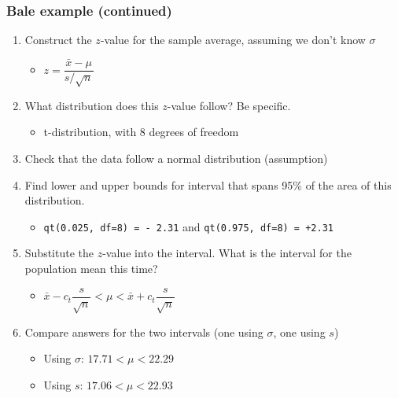 \begin{frame}\frametitle{Bale example (continued)}
	\begin{enumerate}
		\item Construct the $z$-value for the sample average, assuming we don't know $\sigma$ \pause
		\begin{itemize}
			\item $z = \dfrac{\bar{x} - \mu}{s/\sqrt{n}}$
		\end{itemize}
		\item What distribution does this $z$-value follow? Be specific. \pause
		\begin{itemize}
			\item t-distribution, with 8 degrees of freedom
		\end{itemize}
		\item Check that the data follow a normal distribution (assumption)
		\item Find lower and upper bounds for interval that spans 95\% of the area of this distribution. \pause
		\begin{itemize}
			\item \texttt{qt(0.025, df=8) = - 2.31} and \texttt{qt(0.975, df=8) = +2.31}
		\end{itemize}
		\item Substitute the $z$-value into the interval. What is the interval for the population mean this time? \pause
		\begin{itemize}
			\item $\bar{x} - c_t\dfrac{s}{\sqrt{n}} < \mu < \bar{x} + c_t\dfrac{s}{\sqrt{n}}$
		\end{itemize}
		\item Compare answers for the two intervals (one using $\sigma$, one using $s$)\pause
		\begin{itemize}
			\item Using $\sigma$: $17.71 < \mu < 22.29$
			\item Using $s$: $17.06 < \mu < 22.93$
		\end{itemize}
	\end{enumerate}
\end{frame}

